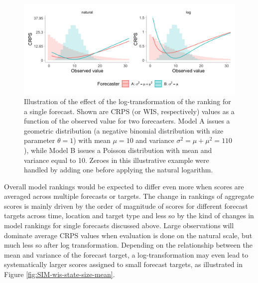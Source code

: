 \documentclass{article}
\begin{document}
\begin{figure}[h!]
\centering
\includegraphics[width = 1\textwidth]{output/figures/illustration-effect-log-ranking-crps.png}
\caption{Illustration of the effect of the log-transformation of the ranking for a single forecast. Shown are CRPS (or WIS, respectively) values as a function of the observed value for two forecasters. Model A issues a geometric distribution (a negative binomial distribution with size parameter $\theta = 1$) with mean $\mu = 10$ and variance $\sigma^2 = \mu + \mu^2 = 110$), while Model B issues a Poisson distribution with mean and variance equal to 10. Zeroes in this illustrative example were handled by adding one before applying the natural logarithm.}
\label{fig:illustration-ranking}
\end{figure}

Overall model rankings would be expected to differ even more when scores are averaged across multiple forecasts or targets. The change in rankings of aggregate scores is mainly driven by the order of magnitude of scores for different forecast targets across time, location and target type and less so by the kind of changes in model rankings for single forecasts discussed above. Large observations will dominate average CRPS values when evaluation is done on the natural scale, but much less so after log transformation. Depending on the relationship between the mean and variance of the forecast target, a log-transformation may even lead to systematically larger scores assigned to small forecast targets, as illustrated in Figure \ref{fig:SIM-wis-state-size-mean}. 


\end{document}
